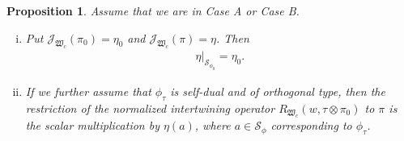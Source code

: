 \documentclass[article]{article}
\numberwithin{equation}{section}
\newtheorem{proposition}[theorem]{Proposition}
\theoremstyle{definition}
\begin{document}
\begin{proposition}\label{localintertwing}
Assume that we are in Case A or Case B. 
\begin{enumerate}[(i)]
	\item Put $\mathcal J_{\mathfrak W_{c}}(\pi_0)=\eta_0$ and $\mathcal J_{\mathfrak W_{c}}(\pi)=\eta$. Then 
	\begin{align*}
	\eta|_{\mathcal S_{\phi_0}}=\eta_0. 
	\end{align*}
	\item If we further assume that $\phi_{\tau}$ is self-dual and of orthogonal type, then the restriction of the normalized intertwining operator $R_{\mathfrak W_{c}}(w,\tau\otimes \pi_0)$ to $\pi$ is the scalar multiplication by $\eta(a)$, where $a\in \mathcal {S}_{\phi}$ corresponding to $\phi_{\tau}$. 
\end{enumerate} 
\end{proposition}
\end{document}
